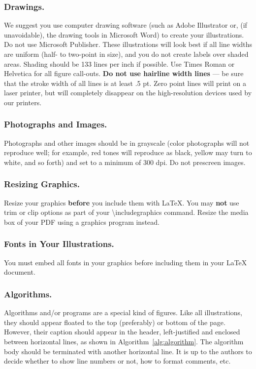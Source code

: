 \subsubsection{Drawings.}
We suggest you use computer drawing software (such as Adobe Illustrator or, (if unavoidable), the drawing tools in Microsoft Word) to create your illustrations. Do not use Microsoft Publisher. These illustrations will look best if all line widths are uniform (half- to two-point in size), and you do not create labels over shaded areas. Shading should be 133 lines per inch if possible. Use Times Roman or Helvetica for all figure call-outs. \textbf{Do not use hairline width lines} --- be sure that the stroke width of all lines is at least .5 pt. Zero point lines will print on a laser printer, but will completely disappear on the high-resolution devices used by our printers.

\subsubsection{Photographs and Images.}
Photographs and other images should be in grayscale (color photographs will not reproduce well; for example, red tones will reproduce as black, yellow may turn to white, and so forth) and set to a minimum of 300 dpi. Do not prescreen images.

\subsubsection{Resizing Graphics.}
Resize your graphics \textbf{before} you include them with LaTeX. You may \textbf{not} use trim or clip options as part of your \textbackslash includegraphics command. Resize the media box of your PDF using a graphics program instead.

\subsubsection{Fonts in Your Illustrations.}
You must embed all fonts in your graphics before including them in your LaTeX document.

\subsubsection{Algorithms.}
Algorithms and/or programs are a special kind of figures. Like all illustrations, they should appear floated to the top (preferably) or bottom of the page. However, their caption should appear in the header, left-justified and enclosed between horizontal lines, as shown in Algorithm~\ref{alg:algorithm}. The algorithm body should be terminated with another horizontal line. It is up to the authors to decide whether to show line numbers or not, how to format comments, etc.

